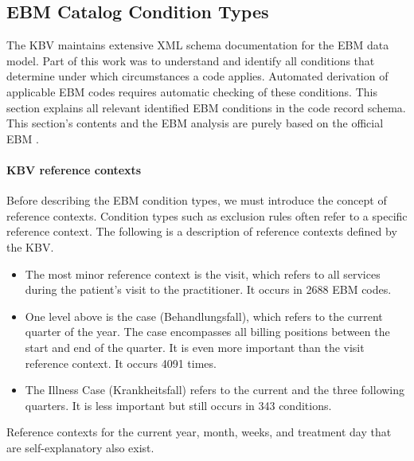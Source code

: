 \subsection{EBM Catalog Condition Types}\label{subsec:ebm-conditions}
The KBV maintains extensive XML schema documentation for the EBM data model.
Part of this work was to understand and identify all conditions that determine under which circumstances a code applies.
Automated derivation of applicable EBM codes requires automatic checking of these conditions.
This section explains all relevant identified EBM conditions in the code record schema.
This section's contents and the EBM analysis are purely based on the official EBM \cite{hermanns2015ebm}.

\paragraph{KBV reference contexts}\label{par:kbv-reference-contexts}
Before describing the EBM condition types, we must introduce the concept of reference contexts.
Condition types such as exclusion rules often refer to a specific reference context.
The following is a description of reference contexts defined by the KBV.

\begin{itemize}
    \item The most minor reference context is the visit, which refers to all services during the patient's visit to the practitioner.
    It occurs in 2688 EBM codes.
    \item One level above is the case (Behandlungsfall), which refers to the current quarter of the year.
    The case encompasses all billing positions between the start and end of the quarter.
    It is even more important than the visit reference context.
    It occurs 4091 times.
    \item The Illness Case (Krankheitsfall) refers to the current and the three following quarters.
    It is less important but still occurs in 343 conditions.
\end{itemize}
Reference contexts for the current year, month, weeks, and treatment day that are self-explanatory also exist.

